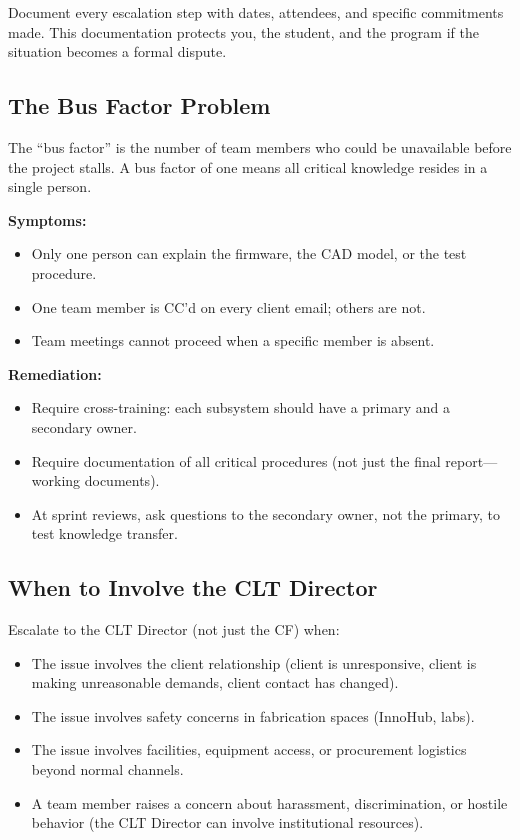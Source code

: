\begin{paaction}
Document every escalation step with dates, attendees, and specific commitments made. This documentation protects you, the student, and the program if the situation becomes a formal dispute.
\end{paaction}

\subsection{The Bus Factor Problem}

The ``bus factor'' is the number of team members who could be unavailable before the project stalls. A bus factor of one means all critical knowledge resides in a single person.

\textbf{Symptoms:}
\begin{itemize}[nosep,leftmargin=1.5em]
\item Only one person can explain the firmware, the CAD model, or the test procedure.
\item One team member is CC'd on every client email; others are not.
\item Team meetings cannot proceed when a specific member is absent.
\end{itemize}

\textbf{Remediation:}
\begin{itemize}[nosep,leftmargin=1.5em]
\item Require cross-training: each subsystem should have a primary and a secondary owner.
\item Require documentation of all critical procedures (not just the final report---working documents).
\item At sprint reviews, ask questions to the secondary owner, not the primary, to test knowledge transfer.
\end{itemize}

\subsection{When to Involve the CLT Director}

Escalate to the CLT Director (not just the CF) when:

\begin{itemize}[nosep,leftmargin=1.5em]
\item The issue involves the client relationship (client is unresponsive, client is making unreasonable demands, client contact has changed).
\item The issue involves safety concerns in fabrication spaces (InnoHub, labs).
\item The issue involves facilities, equipment access, or procurement logistics beyond normal channels.
\item A team member raises a concern about harassment, discrimination, or hostile behavior (the CLT Director can involve institutional resources).
\end{itemize}

